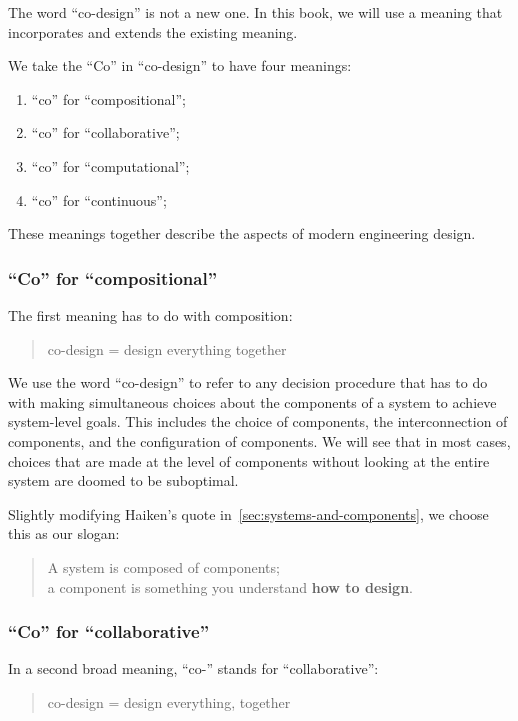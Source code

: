 The word ``co-design'' is not a new one. In this book, we will use
a meaning that incorporates and extends the existing meaning.

We take the ``Co'' in ``co-design'' to have four meanings:
\begin{enumerate}
    \item ``co'' for ``compositional'';
    \item ``co'' for ``collaborative'';
    \item  ``co'' for ``computational'';
    \item   ``co'' for ``continuous'';
\end{enumerate}
These meanings together describe the aspects of modern engineering design.


\subsubsection{``Co'' for ``compositional''}

The first meaning has to do with composition:

\begin{quote}
     co-design = design everything together
\end{quote}

We use the word ``co-design'' to refer to any decision procedure that has to do with making
simultaneous choices about the components of a system  to achieve system-level
goals. This includes the choice of components, the interconnection of components, and the configuration of components. We will see that in most cases, choices that are made at the level of components without looking at the entire system are doomed to be suboptimal.


Slightly modifying Haiken's quote in~\cref{sec:systems-and-components}, we choose this as our slogan:

\begin{quote}
     A system is composed of components;\\
       a component is something you understand
       \textbf{how to design}.
\end{quote}

\subsubsection{``Co'' for ``collaborative''}

In a second broad meaning, ``co-'' stands for ``collaborative'':

\begin{quote}
    co-design = design everything, together
\end{quote}


